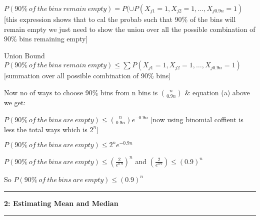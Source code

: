 \documentclass[11pt]{article}
\newcommand\question[2]{\vspace{.25in}\hrule\textbf{#1: #2}\vspace{.5em}\hrule\vspace{.10in}}
\begin{document}
$P(90\%\ of\ the\ bins\ remain\ empty) = P(\cup P(X_{j1} = 1, X_{j2} = 1, \dots , X_{j0.9n} = 1)$ [this expression shows that to cal the probab such that 90\% of the bins will remain empty we just need to show the union over all the possible combination of 90\% bins remaining empty]

Union Bound
$P(90\%\ of\ the\ bins\ remain\ empty) \leq \sum\limits_{}^{} P(X_{j1} = 1, X_{j2} = 1, \dots , X_{j0.9n} = 1)$ [summation over all possible combination of 90\% bins]

Now no of ways to choose 90\% bins from n bins is ${n \choose 0.9n}$ $\&$ equation (a) above we get:

$P(90\%\ of\ the\ bins\ are\ empty) \leq {n \choose 0.9n} e^{-0.9n}$ [now using binomial coffient is less the total ways which is $2^{n}$]

$P(90\%\ of\ the\ bins\ are\ empty) \leq 2^{n} e^{-0.9n}$

$P(90\%\ of\ the\ bins\ are\ empty) \leq (\frac{2}{e^{0.9}})^{n}$ and $(\frac{2}{e^{0.9}}) \leq (0.9)^{n}$

So $P(90\%\ of\ the\ bins\ are\ empty) \leq (0.9)^{n}$

\question{2}{Estimating Mean and Median}
\end{document}
